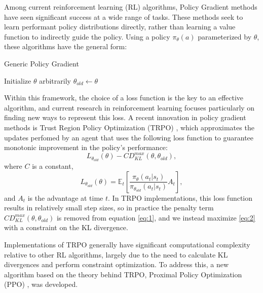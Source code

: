 \documentclass[letterpaper,twocolumn,10pt]{article}
\begin{document}
Among current reinforcement learning (RL) algorithms, Policy Gradient methods
have seen significant success at a wide range of tasks. These methods seek to
learn performant policy distributions directly, rather than learning a value
function to indirectly guide the policy. Using a policy $\pi_{\theta}(a)$ parameterized by $\theta$, these
algorithms have the general form: 
\begin{algorithm}[H]
    \caption{Generic Policy Gradient}
    \begin{algorithmic}
        \State Initialize $\theta$ arbitrarily
            \State $\theta_{old} \gets \theta$
        \EndWhile
    \end{algorithmic}
\end{algorithm}
Within this framework, the choice of a loss function is the key to an effective
algorithm, and current research in reinforcement learning focuses particularly
on finding new ways to represent this loss. A recent innovation in policy
gradient methods is Trust Region Policy Optimization (TRPO) 
\cite{DBLP:journals/corr/SchulmanLMJA15}, which approximates
the updates perfomed by an agent that uses the following loss function to 
guarantee monotonic improvement in the policy's performance:
\begin{equation}
    L_{\theta_{old}}(\theta) 
    - CD_{KL}^{max}(\theta, \theta_{old}),
    \label{eq:1}
\end{equation}
where $C$ is a constant,
\begin{equation}
L_{\theta_{old}}(\theta) =
    \mathbb{E}_t \left[ 
        \frac
        {\pi_{\theta}(a_t | s_t)}
        {\pi_{\theta_{old}} (a_t | s_t)}
        A_t
    \right],
    \label{eq:2}
\end{equation}
and $A_t$ is the advantage at time $t$.
In TRPO implementations, this loss function results in relatively
small step sizes, so in practice the penalty term $CD_{KL}^{max}(\theta,
\theta_{old})$ is removed from equation \eqref{eq:1}, and we instead maximize
\eqref{eq:2} with a constraint on the KL divergence.

Implementations of TRPO generally have significant computational complexity
relative to other RL algorithms, largely due to the need to calculate KL
divergences and perform constraint optimization. To address this, a new
algorithm based on the theory behind TRPO, Proximal Policy Optimization (PPO)
\cite{DBLP:journals/corr/SchulmanWDRK17}, was developed.
\end{document}
